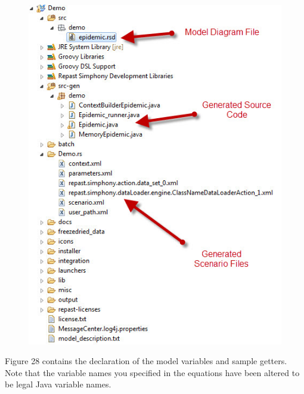 \documentclass[11pt]{amsart}
\begin{document}
\begin{figure}[ht]
\begin{center}
\vspace{.2in}
\centerline {
\includegraphics[totalheight=0.45\textheight]{images/027.jpg}
}
\caption{}
\label{fig:027}
\end{center}
\end{figure}


Figure 28 contains the declaration of the model variables and sample getters. Note that the variable names you specified in the equations have been altered to be legal Java variable names.
\end{document}
